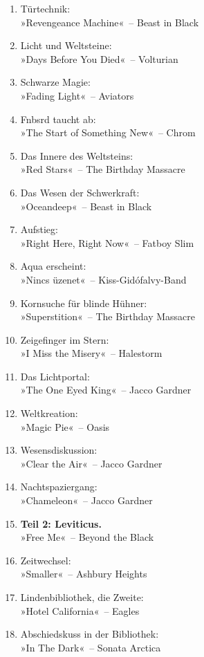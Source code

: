 \begin{enumerate}
    \item Türtechnik:\\ »Revengeance Machine«~– Beast in Black
    \item Licht und Weltsteine:\\ »Days Before You Died«~– Volturian
    \item Schwarze Magie:\\ »Fading Light«~– Aviators
    \item Fnbsrd taucht ab:\\ »The Start of Something New«~– Chrom
    \item Das Innere des Weltsteins:\\ »Red Stars«~– The Birthday Massacre
    \item Das Wesen der Schwerkraft:\\ »Oceandeep«~– Beast in Black
    \item Aufstieg:\\ »Right Here, Right Now«~– Fatboy Slim
    \item Aqua erscheint:\\ »Nincs üzenet«~– Kiss-Gidófalvy-Band
    \item Kornsuche für blinde Hühner:\\ »Superstition«~– The Birthday Massacre
    \item Zeigefinger im Stern:\\ »I Miss the Misery«~– Halestorm
    \item Das Lichtportal:\\ »The One Eyed King«~– Jacco Gardner
    \item Weltkreation:\\ »Magic Pie«~– Oasis
    \item Wesensdiskussion:\\ »Clear the Air«~– Jacco Gardner
    \item Nachtspaziergang:\\ »Chameleon«~– Jacco Gardner
    \item \textbf{Teil 2: Leviticus.}\\ »Free Me«~– Beyond the Black
    \item Zeitwechsel:\\ »Smaller«~– Ashbury Heights
    \item Lindenbibliothek, die Zweite:\\ »Hotel California«~– Eagles
    \item Abschiedskuss in der Bibliothek:\\ »In The Dark«~– Sonata Arctica

\end{enumerate}
